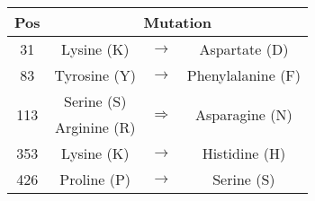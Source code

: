 \begin{table}[ht]
  \centering
  \begin{tabular}[t]{ c | c  c  c }
    \hline
    \textbf{Pos} & \multicolumn{3}{c}{\textbf{Mutation}} \\
    \hline
    31 & Lysine (K) & $\to$ & Aspartate (D){\rule{0pt}{2.6ex}} \\[1mm]
    83 & Tyrosine (Y) & $\to$ & Phenylalanine (F) \\[1mm]
    \multirow{2}{*}{113} & Serine (S) & \multirow{2}{*}{$\Rightarrow$} & \multirow{2}{*}{Asparagine (N)} \\
    & Arginine (R) \\[1mm]
    353 & Lysine (K) & $\to$ & Histidine (H) \\[1mm]
    426 & Proline (P) & $\to$ & Serine (S) \\[1mm]
    \hline
  \end{tabular}
\end{table}